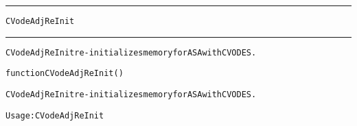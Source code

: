 \begin{samepage}
\hrule
\begin{center}
{\large \verb!CVodeAdjReInit!}
\label{p:CVodeAdjReInit}
\end{center}
\hrule\vspace{0.1in}



\begin{alltt}
CVodeAdjReInit re-initializes memory for ASA with CVODES.
\end{alltt}

\end{samepage}



\begin{samepage}


\begin{alltt}
function CVodeAdjReInit() 
\end{alltt}

\end{samepage}



\begin{alltt}
CVodeAdjReInit re-initializes memory for ASA with CVODES.

   Usage: CVodeAdjReInit
\end{alltt}






\vspace{0.1in}